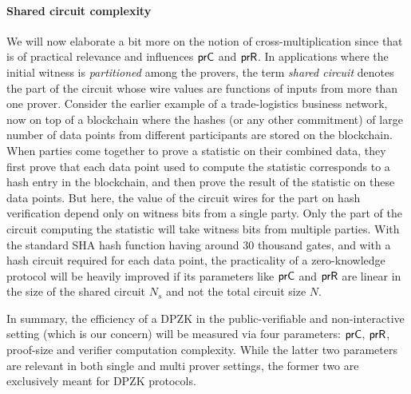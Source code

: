 \paragraph{Shared circuit complexity}
We will now elaborate a bit more on the notion of cross-multiplication since that is of practical relevance and influences $\mathsf{prC}$ and $\mathsf{prR}$. In applications where the initial witness is \textit{partitioned} among the provers, the term \textit{shared circuit} denotes the part of the circuit whose wire values are functions of inputs from more than one prover. Consider the earlier example of a trade-logistics business network, now on top of a blockchain where the hashes (or any other commitment) of large number of data points from different participants are stored on the blockchain. When parties come together to prove a statistic on their combined data, they first prove that each data point used to compute the statistic corresponds to a hash entry in the blockchain, and then prove the result of the statistic on these data points. But here, the value of the circuit wires for the part on hash verification depend only on witness bits from a single party. Only the part of the circuit computing the statistic will take witness bits from multiple parties. With the standard SHA hash function having around 30 thousand gates, and with a hash circuit required for each data point, the practicality of a zero-knowledge protocol will be heavily improved if its parameters like $\mathsf{prC}$ and $\mathsf{prR}$ are linear in the size of the shared circuit $N_s$ and not the total circuit size $N$.

 In summary, the efficiency of a DPZK in the public-verifiable and non-interactive setting (which is our concern) will be measured via four parameters:  $\mathsf{prC}$,  $\mathsf{prR}$, proof-size and verifier computation complexity. While the latter two parameters are relevant in both single and multi prover settings, the former two are exclusively meant for DPZK protocols.    

